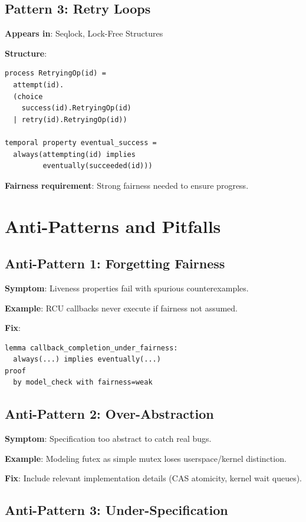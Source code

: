 \documentclass[conference]{IEEEtran}
\begin{document}
\subsection{Pattern 3: Retry Loops}

\textbf{Appears in}: Seqlock, Lock-Free Structures

\textbf{Structure}:
\begin{lstlisting}
process RetryingOp(id) =
  attempt(id).
  (choice
    success(id).RetryingOp(id)
  | retry(id).RetryingOp(id))

temporal property eventual_success =
  always(attempting(id) implies
         eventually(succeeded(id)))
\end{lstlisting}

\textbf{Fairness requirement}: Strong fairness needed to ensure progress.

\section{Anti-Patterns and Pitfalls}

\subsection{Anti-Pattern 1: Forgetting Fairness}

\textbf{Symptom}: Liveness properties fail with spurious counterexamples.

\textbf{Example}: RCU callbacks never execute if fairness not assumed.

\textbf{Fix}:
\begin{lstlisting}
lemma callback_completion_under_fairness:
  always(...) implies eventually(...)
proof
  by model_check with fairness=weak
\end{lstlisting}

\subsection{Anti-Pattern 2: Over-Abstraction}

\textbf{Symptom}: Specification too abstract to catch real bugs.

\textbf{Example}: Modeling futex as simple mutex loses userspace/kernel distinction.

\textbf{Fix}: Include relevant implementation details (CAS atomicity, kernel wait queues).

\subsection{Anti-Pattern 3: Under-Specification}
\end{document}
